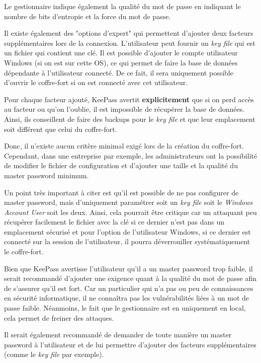 Le gestionnaire indique également la qualité du mot de passe en indiquant le nombre de bits d'entropie et la force du mot de passe. 

Il existe également des "options d'expert" qui permettent d'ajouter deux facteurs supplémentaires lors de la connexion. L'utilisateur peut fournir un \textit{key file} qui est un fichier qui contient une clé. Il est possible d'ajouter le compte utilisateur Windows (si on est sur cette OS), ce qui permet de faire la base de données dépendante à l'utilisateur connecté. De ce fait, il sera uniquement possible d'ouvrir le coffre-fort si on est connecté avec cet utilisateur. 

Pour chaque facteur ajouté, KeePass avertit \textbf{explicitement} que si on perd accès au facteur ou qu'on l'oublie, il est impossible de récupérer la base de données. Ainsi, ils conseillent de faire des backups pour le \textit{key file} et que leur emplacement soit différent que celui du coffre-fort.

Donc, il n'existe aucun critère minimal exigé lors de la création du coffre-fort. Cependant, dans une entreprise par exemple, les administrateurs ont la possibilité de modifier le fichier de configuration et d'ajouter une taille et la qualité du master password minimum. 

Un point très important à citer est qu'il est possible de ne pas configurer de master password, mais d'uniquement paramétrer soit un \textit{key file} soit le \textit{Windows Account User} soit les deux. Ainsi, cela pourrait être critique car un attaquant peu récupérer facilement le fichier avec la clé si ce dernier n'est pas dans un emplacement sécurisé et pour l'option de l'utilisateur Windows, si ce dernier est connecté sur la session de l'utilisateur, il pourra déverrouiller systématiquement le coffre-fort.

Bien que KeePass avertisse l'utilisateur qu'il a un master password trop faible, il serait recommandé d'ajouter une exigence quant à la qualité du mot de passe afin de s'assurer qu'il est fort. Car un particulier qui n'a pas ou peu de connaissances en sécurité informatique, il ne connaîtra pas les vulnérabilités liées à un mot de passe faible. Néanmoins, le fait que le gestionnaire est en uniquement en local, cela permet de freiner des attaques.

Il serait également recommandé de demander de toute manière un master password à l'utilisateur et de lui permettre d'ajouter des facteurs supplémentaires (comme le \textit{key file} par exemple).

